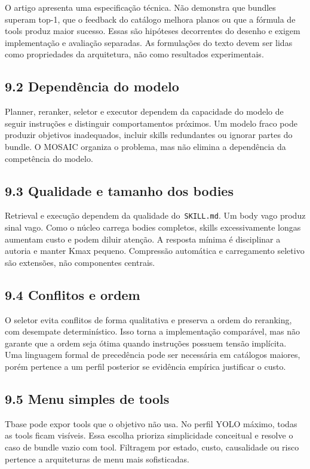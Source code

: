 \documentclass[12pt,a4paper]{article}
\begin{document}
O artigo apresenta uma especificação técnica. Não demonstra que bundles superam top-1, que o feedback do catálogo melhora planos ou que a fórmula de tools produz maior sucesso. Essas são hipóteses decorrentes do desenho e exigem implementação e avaliação separadas. As formulações do texto devem ser lidas como propriedades da arquitetura, não como resultados experimentais.


\subsection*{9.2 Dependência do modelo}

Planner, reranker, seletor e executor dependem da capacidade do modelo de seguir instruções e distinguir comportamentos próximos. Um modelo fraco pode produzir objetivos inadequados, incluir skills redundantes ou ignorar partes do bundle. O MOSAIC organiza o problema, mas não elimina a dependência da competência do modelo.


\subsection*{9.3 Qualidade e tamanho dos bodies}

Retrieval e execução dependem da qualidade do\texttt{ SKILL.md}. Um body vago produz sinal vago. Como o núcleo carrega bodies completos, skills excessivamente longas aumentam custo e podem diluir atenção. A resposta mínima é disciplinar a autoria e manter Kmax pequeno. Compressão automática e carregamento seletivo são extensões, não componentes centrais.


\subsection*{9.4 Conflitos e ordem}

O seletor evita conflitos de forma qualitativa e preserva a ordem do reranking, com desempate determinístico. Isso torna a implementação comparável, mas não garante que a ordem seja ótima quando instruções possuem tensão implícita. Uma linguagem formal de precedência pode ser necessária em catálogos maiores, porém pertence a um perfil posterior se evidência empírica justificar o custo.


\subsection*{9.5 Menu simples de tools}

Tbase pode expor tools que o objetivo não usa. No perfil YOLO máximo, todas as tools ficam visíveis. Essa escolha prioriza simplicidade conceitual e resolve o caso de bundle vazio com tool. Filtragem por estado, custo, causalidade ou risco pertence a arquiteturas de menu mais sofisticadas.
\end{document}

